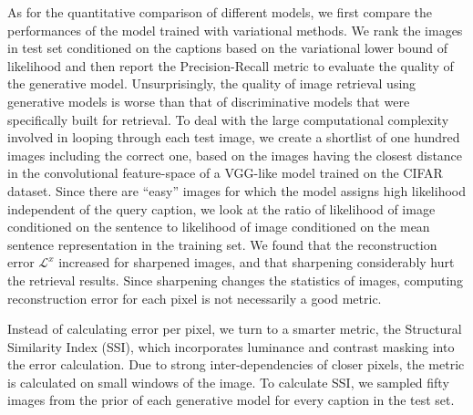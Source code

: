 \documentclass{article} %
\newcommand{\rloss}{\mathcal{L}^{x}}
\begin{document}
As for the quantitative comparison of different models, we first compare the performances of the model trained with variational methods. We rank the images in test set conditioned on the captions based on the variational lower bound of likelihood and then report the Precision-Recall metric to evaluate the quality of the generative model. Unsurprisingly, the quality of image retrieval using generative models is worse than that of discriminative models that were specifically built for retrieval. To deal with the large computational complexity involved in looping through each test image, we create a shortlist of one hundred images including the correct one, based on the images having the closest distance in the convolutional feature-space of a VGG-like model trained on the CIFAR dataset. Since there are ``easy'' images for which the model assigns high likelihood independent of the query caption, we look at the ratio of likelihood of image conditioned on the sentence to likelihood of image conditioned on the mean sentence representation in the training set. We found that the reconstruction error $\rloss$ increased for sharpened images, and that sharpening considerably hurt the retrieval results. Since sharpening changes the statistics of images, computing reconstruction error for each pixel is not necessarily a good metric.

Instead of calculating error per pixel, we turn to a smarter metric, the Structural Similarity Index (SSI), which incorporates luminance and contrast masking into the error calculation. Due to strong inter-dependencies of closer pixels, the metric is calculated on small windows of the image. To calculate SSI, we sampled fifty images from the prior of each generative model for every caption in the test set.
\end{document}
